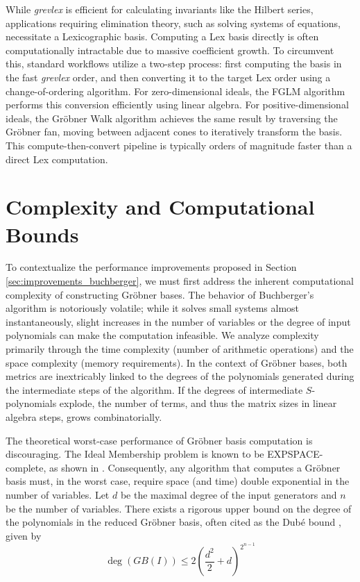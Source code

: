 While \textit{grevlex} is efficient for calculating invariants like the Hilbert series, applications requiring elimination theory, such as solving systems of equations, necessitate a Lexicographic basis. Computing a Lex basis directly is often computationally intractable due to massive coefficient growth. To circumvent this, standard workflows utilize a two-step process: first computing the basis in the fast \textit{grevlex} order, and then converting it to the target Lex order using a change-of-ordering algorithm. For zero-dimensional ideals, the FGLM algorithm \cite{Faugere1993_FGLM, Gerdt2003_ImplementationFGLM} performs this conversion efficiently using linear algebra. For positive-dimensional ideals, the Gröbner Walk algorithm \cite{Collart1997_walk, Amrhein1997_OnTheWalk, Fukuda2005_groebnerwalk, Tran2000_FastAlgorithmForGBConversion} achieves the same result by traversing the Gröbner fan, moving between adjacent cones to iteratively transform the basis. This compute-then-convert pipeline is typically orders of magnitude faster than a direct Lex computation.

\section{Complexity and Computational Bounds}

To contextualize the performance improvements proposed in Section \ref{sec:improvements_buchberger}, we must first address the inherent computational complexity of constructing Gröbner bases. The behavior of Buchberger's algorithm is notoriously volatile; while it solves small systems almost instantaneously, slight increases in the number of variables or the degree of input polynomials can make the computation infeasible. We analyze complexity primarily through the time complexity (number of arithmetic operations) and the space complexity (memory requirements). In the context of Gröbner bases, both metrics are inextricably linked to the degrees of the polynomials generated during the intermediate steps of the algorithm. If the degrees of intermediate $S$-polynomials explode, the number of terms, and thus the matrix sizes in linear algebra steps, grows combinatorially.

The theoretical worst-case performance of Gröbner basis computation is discouraging. The Ideal Membership problem is known to be EXPSPACE-complete, as shown in \cite{Mayr1982_ComplexityWordProblems}. Consequently, any algorithm that computes a Gröbner basis must, in the worst case, require space (and time) double exponential in the number of variables. Let $d$ be the maximal degree of the input generators and $n$ be the number of variables. There exists a rigorous upper bound on the degree of the polynomials in the reduced Gröbner basis, often cited as the Dubé bound \cite{Maletzky2019_DubeDegrees, bayer1993_WhatCanBeComputed}, given by
$$
\deg(GB(I)) \leq 2 \left( \frac{d^2}{2} + d \right)^{2^{n-1}}
$$

